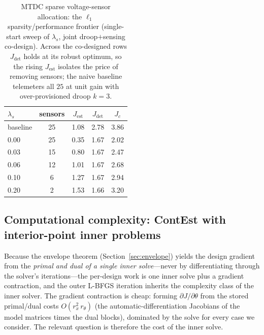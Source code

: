 \documentclass[twocolumn,amsthm]{autart}
\begin{document}
\begin{table}[t]
\centering
\caption{MTDC sparse voltage-sensor allocation: the $\ell_1$ sparsity/performance
frontier (single-start sweep of $\lambda_s$, joint droop$+$sensing co-design).
Across the co-designed rows $J_{\mathrm{det}}$ holds at its robust optimum, so the
rising $J_{\mathrm{est}}$ isolates the price of removing sensors; the naive
baseline telemeters all $25$ at unit gain with over-provisioned droop $k=3$.}
\label{tab:mtdc-alloc}
\begin{tabular}{lcccc}
\hline
$\lambda_s$ & sensors & $J_{\mathrm{est}}$ & $J_{\mathrm{det}}$ & $J_c$ \\
\hline
baseline & 25 & 1.08 & 2.78 & 3.86 \\
0.00     & 25 & 0.35 & 1.67 & 2.02 \\
0.03     & 15 & 0.80 & 1.67 & 2.47 \\
0.06     & 12 & 1.01 & 1.67 & 2.68 \\
0.10     &  6 & 1.27 & 1.67 & 2.94 \\
0.20     &  2 & 1.53 & 1.66 & 3.20 \\
\hline
\end{tabular}
\end{table}

\subsection{Computational complexity: ContEst with interior-point inner problems}
\label{sec:sim:complexity}

Because the envelope theorem (Section~\ref{sec:envelope}) yields the design
gradient from the \emph{primal and dual of a single inner solve}---never by
differentiating through the solver's iterations---the per-design work is one inner
solve plus a gradient contraction, and the outer L-BFGS iteration inherits the
complexity class of the inner solver. The gradient contraction is cheap: forming
$\partial J/\partial\theta$ from the stored primal/dual costs
$O(r_x^2\,r_\theta)$ (the automatic-differentiation Jacobians of the model
matrices times the dual blocks), dominated by the solve for every case we
consider. The relevant question is therefore the cost of the inner solve.
\end{document}
